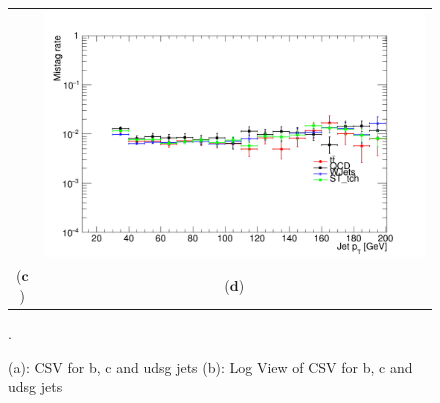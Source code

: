 \documentclass{cmspaper}
\begin{document}
\begin{figure}[htp]
\begin{tabular}{cc}
& \hspace{-0.5cm} \includegraphics[scale=0.20]{genPlots/btagged/MistagRate_pfCSVv2IVFM.png}\\
   ($\mathbf{c}$)\qquad\qquad&($\mathbf{d}$)\qquad\qquad\qquad\\
\end{tabular}
\caption{(a): CSV for b, c and udsg jets (b): Log View of CSV for b, c and udsg jets}.\label{CSVforb_c_udsg_jets}
\end{figure}
\end{document}
